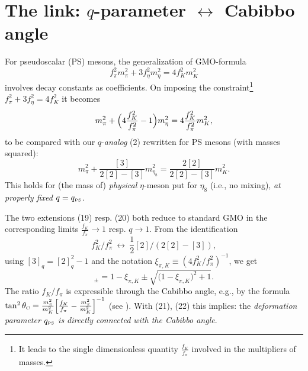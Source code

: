 \documentclass[twoside]{article}
\newcommand{\scr}{\rm\scriptscriptstyle}
\begin{document}
\section{The link: $q$-parameter $\leftrightarrow$ Cabibbo angle}
For pseudoscalar (PS) mesons, the generalization   \cite{oku70}
of GMO-formula
\begin{equation}
f_\pi^2 m_\pi^2 + 3 f_\eta^2 m_\eta^2 = 4 f_K^2 m_K^2      \label{18}
\end{equation}
involves decay constants as coefficients.
On imposing the constraint\footnote{  It leads to the single
dimensionless quantity $\frac{f_K}{f_\pi}$ involved in
the multipliers of masses.}
${f^{2}_\pi} + {3} {f^{2}_\eta} = {4}{f^{2}_K}$ it becomes
\begin{equation}
m_\pi^2 +      %
\Bigl( 4 \frac{f_K^2}{f_\pi^2} - 1 \Bigr) m_\eta^2
= 4 \frac{f_K^2}{f_\pi^2} m_K^2 ,                          \label{19}
\end{equation}
to be compared with our $q$-{\it analog} (2) rewritten for PS mesons
(with masses squared):
\begin{equation}
m_\pi^2 + \frac{[3]}{2 [2] - [3]} m_{\eta_8}^2
= \frac{2 [2]}{2 [2] - [3]} m_K^2 .                        \label{20}
\end{equation}
This holds for (the mass of) {\it physical} $\eta$-meson put
for $\eta_8$ (i.e., no mixing), {\it at properly fixed} $q=q_{\scr{PS}}$.

The two extensions (19) resp. (20) both reduce to standard GMO
in the corresponding limits $\frac{f_K}{f_\pi}\to 1$ resp. $q\to 1$.
From the identification
\begin{equation}
{f_K^2}/{f_\pi^2} \
      \leftrightarrow \  {\frac12 [2]}/({2[2]\!-\![3]}),    \label{(21)}
\end{equation}
using $[3]_q=[2]_q^2-1$ and the notation
${\xi}_{\pi,K}\equiv({4 f^2_K/f^2_\pi})^{-1}$, we get
\begin{equation}
[2]_{\pm}= 1 -
{\xi}_{\pi,K}\pm\sqrt{\bigl(1-{\xi}_{\pi,K}\bigr)^2 + 1}.    \label{(22)}
\end{equation}
The ratio $f_K/f_\pi$ is expressible through the Cabibbo angle, e.g.,
by the formula   $\tan^2\theta_{\scr{C}} = \frac{m_\pi^2}{m_K^2}
\Bigl[\frac{f_K}{f_\pi}-\frac{m_\pi^2}{m_K^2}\Bigr]^{-1}$
       (see     \cite{oakes}).
 With (21), (22) this implies: the {\it deformation parameter}
$q_{\scr{PS}}$  {\it is directly connected with the Cabibbo angle}.
\end{document}

